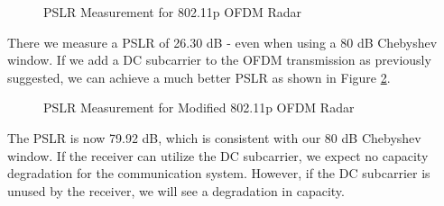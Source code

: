 \documentclass[conference]{IEEEtran}
\begin{document}
\begin{figure}[H]
\centering
{}
\caption{PSLR Measurement for 802.11p OFDM Radar}
\label{fig::pslr_802_11p_ofdm_radar}
\end{figure}

There we measure a PSLR of 26.30 dB - even when using a 80 dB Chebyshev window. If we add a DC subcarrier to the OFDM transmission as previously suggested, we can achieve a much better PSLR as shown in Figure \ref{fig::pslr_802_11p_mod_ofdm_radar}.

\begin{figure}[H]
\centering
{}
\caption{PSLR Measurement for Modified 802.11p OFDM Radar}
\label{fig::pslr_802_11p_mod_ofdm_radar}
\end{figure}

The PSLR is now 79.92 dB, which is consistent with our 80 dB Chebyshev window. If the receiver can utilize the DC subcarrier, we expect no capacity degradation for the communication system. However, if the DC subcarrier is unused by the receiver, we will see a degradation in capacity.
\end{document}
